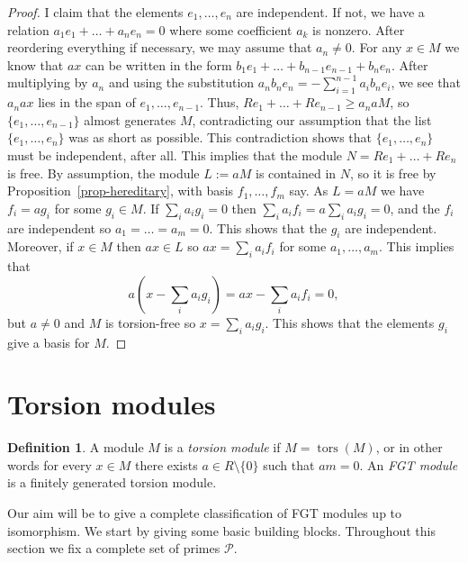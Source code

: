 \documentclass{amsart}
\newcommand{\tors}      {\operatorname{tors}}
\newcommand{\sm}        {\setminus}
\newcommand{\CP}        {{\mathcal{P}}}
\renewcommand{\:}{\colon}
\theoremstyle{definition}
\newtheorem{definition}[theorem]{Definition}
\begin{document}
\begin{proof}
 I claim that the elements $e_1,\ldots,e_n$ are independent.  If not,
 we have a relation $a_1e_1+\ldots+a_ne_n=0$ where some coefficient
 $a_k$ is nonzero.  After reordering everything if necessary, we may
 assume that $a_n\neq 0$.  For any $x\in M$ we know that $ax$ can be
 written in the form $b_1e_1+\ldots+b_{n-1}e_{n-1}+b_ne_n$.  After
 multiplying by $a_n$ and using the substitution
 $a_nb_ne_n=-\sum_{i=1}^{n-1}a_ib_ne_i$, we see that $a_nax$ lies in
 the span of $e_1,\ldots,e_{n-1}$.  Thus,
 $Re_1+\ldots+Re_{n-1}\geq a_naM$, so $\{e_1,\ldots,e_{n-1}\}$ almost
 generates $M$, contradicting our assumption that the list
 $\{e_1,\ldots,e_n\}$ was as short as possible.  This contradiction
 shows that $\{e_1,\ldots,e_n\}$ must be independent, after all.
 This implies that the module $N=Re_1+\ldots+Re_n$ is free.  By
 assumption, the module $L:=aM$ is contained in $N$, so it is free by
 Proposition~\ref{prop-hereditary}, with basis $f_1,\ldots,f_m$ say.
 As $L=aM$ we have $f_i=ag_i$ for some $g_i\in M$.  If
 $\sum_ia_ig_i=0$ then $\sum_ia_if_i=a\sum_ia_ig_i=0$, and the $f_i$
 are independent so $a_1=\ldots=a_m=0$.  This shows that the $g_i$ are
 independent.  Moreover, if $x\in M$ then $ax\in L$ so
 $ax=\sum_ia_if_i$ for some $a_1,\ldots,a_m$.  This implies that 
 \[ a(x-\sum_ia_ig_i)= ax-\sum_ia_if_i=0, \]
 but $a\neq 0$ and $M$ is torsion-free so $x=\sum_ia_ig_i$.  This
 shows that the elements $g_i$ give a basis for $M$.
\end{proof}

\section{Torsion modules}

\begin{definition}\label{defn-tors-module}
 A module $M$ is a \emph{torsion module} if $M=\tors(M)$, or in other
 words for every $x\in M$ there exists $a\in R\sm\{0\}$ such that
 $am=0$.  An \emph{FGT module} is a finitely generated torsion
 module. 
\end{definition}

Our aim will be to give a complete classification of FGT modules up to
isomorphism.  We start by giving some basic building blocks.
Throughout this section we fix a complete set of primes $\CP$.
\end{document}
